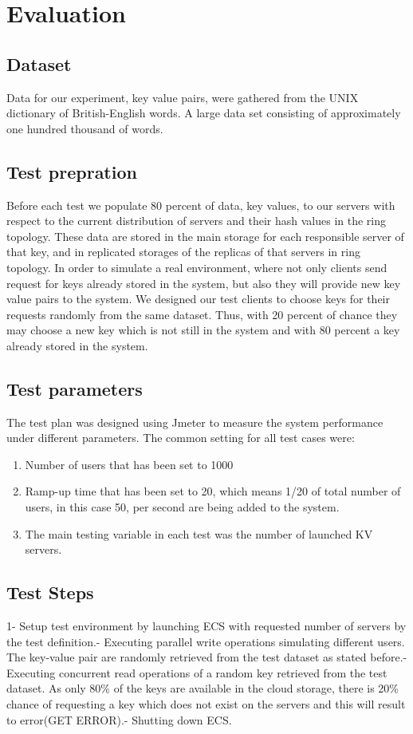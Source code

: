 \documentclass{sig-alternate}
\begin{document}
\section{Evaluation}
\subsection{Dataset}
Data for our experiment, key value pairs, were gathered from the UNIX dictionary of British-English words. A large data set consisting of approximately one hundred thousand of words.
\subsection{Test prepration}
Before each test we populate 80 percent of data, key values, to our servers with respect to the current distribution of servers and their hash values in the ring topology. These data are stored in the main storage for each responsible server of that key, and in replicated storages of the replicas of that servers in ring topology. In order to simulate a real environment, where not only clients send request for keys already stored in the system, but also they will provide new key value pairs to the system. We designed our test clients to choose keys for their requests randomly from the same dataset. Thus, with 20 percent of chance they may choose a new key which is not still in the system and with 80 percent a key already stored in the system. 

\subsection{Test parameters}
The test plan was designed using Jmeter to measure the system performance under different parameters. The common setting for all test cases were:
\begin{enumerate}
\item Number of users that has been set to 1000
\item Ramp-up time that has been set to 20, which means 1/20 of total number of users, in this case 50, per second are being added to the system.
\item The main testing variable in each test was the number of launched KV servers.
\end{enumerate}
		
\subsection{Test Steps}								 			
1-  Setup test environment by launching ECS with requested number of servers by the test definition.-  Executing parallel write operations simulating different users. The key-value pair are randomly retrieved from the test dataset as stated before.-  Executing concurrent read operations of a random key retrieved from the test dataset. As only 80\% of the keys are available in the cloud storage, there is 20\% chance of requesting a key which does not exist on the servers and this will result to error(GET ERROR).-  Shutting down ECS.	
			 					
\end{document}
